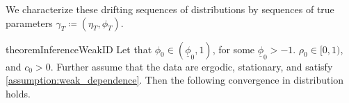 \documentclass[11pt, letterpaper, twoside, final]{article}
\begin{document}
We characterize these drifting sequences of distributions by sequences of true parameters $\gamma_T \coloneqq
(\eta_T, \phi_T)$.


\begin{restatable}{theorem}{InferenceWeakID}
    Let that $\phi_0  \in (\underline{\phi}_0,1)$, for some $\underline{\phi}_0 > -1$. 
    $\rho_0 \in [0,1)$, and $c_0 > 0$. 
    Further assume that the data are ergodic, stationary, and satisfy \cref{assumption:weak_dependence}.
    Then the following convergence in distribution holds.

\end{restatable}


\clearpage

{}
\printbibliography
\clearpage
\end{document}
